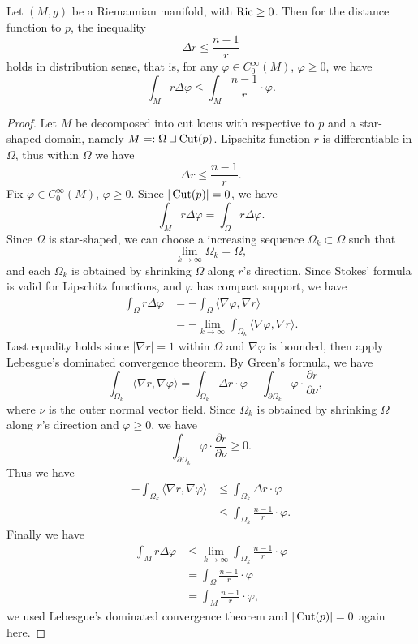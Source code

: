 \begin{thm}
    Let $(M,g)$ be a Riemannian manifold, with $\operatorname{Ric}\geq 0$.
    Then for the distance function to $p$, the inequality
    \[\Delta r\leq\frac{n-1}{r}\]
    holds in distribution sense, that is, for any $\varphi\in C^\infty_0(M)$, $\varphi\geq 0$, we have
    \[\int_Mr\Delta\varphi\leq\int_M\frac{n-1}{r}\cdot\varphi.\]
\end{thm}
\begin{proof}
    Let $M$ be decomposed into cut locus with respective to $p$ and a star-shaped domain, namely $M=:\Omega\sqcup\operatorname{Cut}(p)$.
    Lipschitz function $r$ is differentiable in $\Omega$, thus within $\Omega$ we have
    \[\Delta r\leq\frac{n-1}{r}.\]
    Fix $\varphi\in C^\infty_0(M)$, $\varphi\geq 0$.
    Since $|\operatorname{Cut}(p)|=0$, we have
    \[\int_Mr\Delta\varphi=\int_\Omega r\Delta\varphi.\]
    Since $\Omega$ is star-shaped, we can choose a increasing sequence $\Omega_k\subset\Omega$ such that
    \[\lim_{k\to\infty}\Omega_k=\Omega,\]
    and each $\Omega_k$ is obtained by shrinking $\Omega$ along $r$'s direction.
    Since Stokes' formula is valid for Lipschitz functions, and $\varphi$ has compact support, we have
    \begin{align*}
        \int_\Omega r\Delta\varphi&=-\int_\Omega\langle\nabla\varphi,\nabla r\rangle\\
        &=-\lim_{k\to\infty}\int_{\Omega_k}\langle\nabla\varphi,\nabla r\rangle.
    \end{align*}
    Last equality holds since $|\nabla r|=1$ within $\Omega$ and $\nabla\varphi$ is bounded, then apply Lebesgue's dominated convergence theorem.
    By Green's formula, we have
    \[-\int_{\Omega_k}\langle\nabla r,\nabla\varphi\rangle=\int_{\Omega_k}\Delta r\cdot\varphi-\int_{\partial\Omega_k}\varphi\cdot\frac{\partial r}{\partial\nu},\]
    where $\nu$ is the outer normal vector field.
    Since $\Omega_k$ is obtained by shrinking $\Omega$ along $r$'s direction and $\varphi\geq 0$, we have
    \[\int_{\partial\Omega_k}\varphi\cdot\frac{\partial r}{\partial\nu}\geq 0.\]
    Thus we have
    \begin{align*}
        -\int_{\Omega_k}\langle\nabla r,\nabla\varphi\rangle&\leq\int_{\Omega_k}\Delta r\cdot\varphi\\
        &\leq\int_{\Omega_k}\frac{n-1}{r}\cdot\varphi.
    \end{align*}
    Finally we have
    \begin{align*}
        \int_Mr\Delta\varphi&\leq\lim_{k\to\infty}\int_{\Omega_k}\frac{n-1}{r}\cdot\varphi\\
        &=\int_{\Omega}\frac{n-1}{r}\cdot\varphi\\
        &=\int_M\frac{n-1}{r}\cdot\varphi,
    \end{align*}
    we used Lebesgue's dominated convergence theorem and $|\operatorname{Cut}(p)|=0$ again here.
\end{proof}
